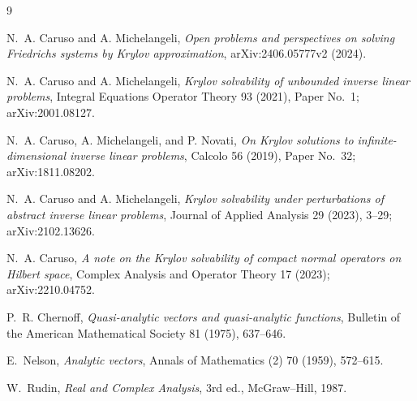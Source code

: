 \documentclass[11pt]{article}
\begin{document}
\begin{thebibliography}{9}

N.~A. Caruso and A. Michelangeli,
\emph{Open problems and perspectives on solving Friedrichs systems by Krylov
approximation}, arXiv:2406.05777v2 (2024).

N.~A. Caruso and A. Michelangeli,
\emph{Krylov solvability of unbounded inverse linear problems},
Integral Equations Operator Theory 93 (2021), Paper No.~1;
arXiv:2001.08127.

N.~A. Caruso, A. Michelangeli, and P. Novati,
\emph{On Krylov solutions to infinite-dimensional inverse linear problems},
Calcolo 56 (2019), Paper No.~32; arXiv:1811.08202.

N.~A. Caruso and A. Michelangeli,
\emph{Krylov solvability under perturbations of abstract inverse linear
problems}, Journal of Applied Analysis 29 (2023), 3--29;
arXiv:2102.13626.

N.~A. Caruso,
\emph{A note on the Krylov solvability of compact normal operators on Hilbert
space}, Complex Analysis and Operator Theory 17 (2023);
arXiv:2210.04752.

P.~R. Chernoff,
\emph{Quasi-analytic vectors and quasi-analytic functions},
Bulletin of the American Mathematical Society 81 (1975), 637--646.

E.~Nelson,
\emph{Analytic vectors}, Annals of Mathematics (2) 70 (1959), 572--615.

W.~Rudin, \emph{Real and Complex Analysis}, 3rd ed., McGraw--Hill, 1987.

\end{thebibliography}
\end{document}
